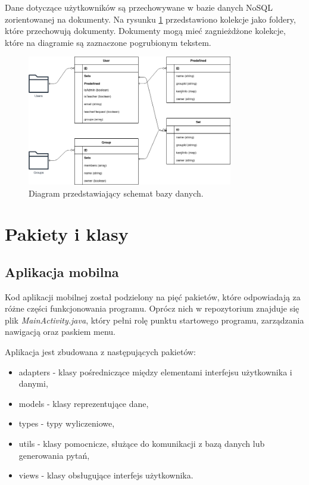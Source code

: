 \documentclass[a4paper,twoside,12pt]{book}
\begin{document}
Dane dotyczące użytkowników są przechowywane w bazie danych NoSQL zorientowanej na dokumenty. Na rysunku \ref{fig:firestore} przedstawiono kolekcje jako foldery, które przechowują dokumenty. Dokumenty mogą mieć zagnieżdżone kolekcje, które na diagramie są zaznaczone pogrubionym tekstem. 

\begin{figure}[]
\centering
\includegraphics[width=0.8\textwidth]{firestore.drawio}
\caption{Diagram przedstawiający schemat bazy danych.}
\label{fig:firestore}
\end{figure}

\section{Pakiety i klasy}

\subsection{Aplikacja mobilna}

Kod aplikacji mobilnej został podzielony na pięć pakietów, które odpowiadają za różne części funkcjonowania programu. Oprócz nich w repozytorium znajduje się plik \textit{MainActivity.java}, który pełni rolę punktu startowego programu, zarządzania nawigacją oraz paskiem menu. 

Aplikacja jest zbudowana z następujących pakietów:
\begin{itemize}
\item adapters - klasy pośredniczące między elementami interfejsu użytkownika i danymi,
\item models - klasy reprezentujące dane,
\item types - typy wyliczeniowe,
\item utils - klasy pomocnicze, służące do komunikacji z bazą danych lub generowania pytań,
\item views - klasy obsługujące interfejs użytkownika.
\end{itemize}
\end{document}
